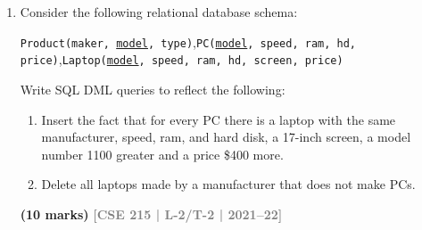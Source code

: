 \documentclass[12pt]{article}
\newcommand{\yr}[1]{\hfill\textcolor{gray}{\small\textbf{[#1]}}}
\newcommand{\mk}[1]{\textcolor{orange!70!black}{\small\textbf{(#1 marks)}}}
\begin{document}
\begin{enumerate}
\noindent You should assume that all entries in all of the tables are not null. Answer the followings:

\vspace{0.2cm}
\noindent i. Give the name of the clients who do not have any request at the moment for any toys.

\vspace{0.2cm}
\noindent ii. List the name of the toys that has weight more than the average weight of the toys with the same color.

\vspace{0.2cm}
\noindent iii. List the name of the requesting clients who have to wait because the toys are currently unavailable at the store.

\vspace{0.2cm}
\noindent iv. List all of the requests where \textit{age} of the client is less than the \textit{min-age} listed for the Toy. The answer should include the client id, client name, and the toy id. The results should be sorted by client name.

\vspace{0.2cm}
\noindent v. Give the id and name of the "most popular" toy. The most popular toy is the one that has more requests than all others. If there is a tie so there is more than one toy with the maximum number of requests, give the id's and names of all of these toys. They do not need to be in any particular order.

\vspace{0.5cm}
\mk{25} \yr{CSE 215 | L-2/T-2 | 2021--22}


\item Consider the following relational database schema:
\begin{center}
\texttt{Product(maker, \underline{model}, type)},\quad \texttt{PC(\underline{model}, speed, ram, hd, price)},\quad \texttt{Laptop(\underline{model}, speed, ram, hd, screen, price)}
\end{center}
Write SQL DML queries to reflect the following:
\begin{enumerate}
  \item Insert the fact that for every PC there is a laptop with the same manufacturer, speed, ram, and hard disk, a 17-inch screen, a model number 1100 greater and a price \$400 more.
  \item Delete all laptops made by a manufacturer that does not make PCs.
\end{enumerate}
\mk{10} \yr{CSE 215 | L-2/T-2 | 2021--22}



\end{enumerate}
\end{document}
